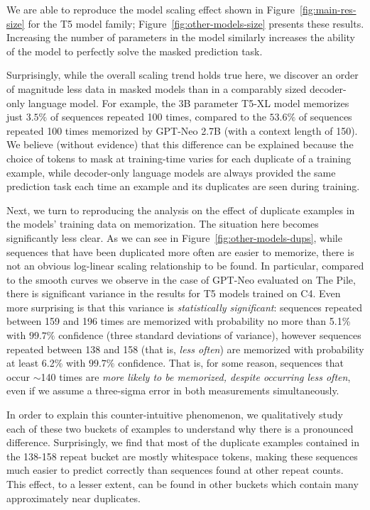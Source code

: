 %
We are able to reproduce the model scaling effect shown in Figure~\ref{fig:main-res-size} for the T5 model family;
Figure~\ref{fig:other-models-size} presents these results.
%
Increasing the number of parameters in the model similarly increases the ability of the model
to perfectly solve the masked prediction task.

Surprisingly, while the overall scaling trend holds true here, we discover an order of magnitude less data in masked models than in a comparably sized decoder-only language model.
%
For example, the $3$B parameter T5-XL model memorizes just $3.5\%$ of sequences repeated 100 times, compared to the $53.6\%$ of sequences repeated 100 times memorized by GPT-Neo 2.7B (with a context length of 150). 
We believe (without evidence) that this difference can be explained because the choice of tokens to mask at training-time varies for each duplicate of a training example, while decoder-only language models are always provided the same prediction task each time an example and its duplicates are seen during training.

Next, we turn to reproducing the analysis on the effect of duplicate examples in the models' training data on memorization.
%
The situation here becomes significantly less clear.
%
As we can see in Figure~\ref{fig:other-models-dups}, while sequences that have been duplicated more often are easier to memorize,
there is not an obvious log-linear scaling relationship to be found.
%
In particular, compared to the smooth curves we observe in the case of GPT-Neo evaluated on The Pile,
there is significant variance in the results for T5 models trained on C4.
%
Even more surprising is that this variance is \emph{statistically significant}:
sequences repeated between 159 and 196 times are memorized with probability no more than 5.1\% with $99.7\%$ confidence (three standard deviations of variance),
however sequences repeated between 138 and 158 (that is, \emph{less often}) are memorized with probability
at least 6.2\% with $99.7\%$ confidence.
%
That is, for some reason, sequences that occur $\sim$140 times are \emph{more likely to be memorized, despite occurring less often}, even if we assume a three-sigma error in both measurements simultaneously.

In order to explain this counter-intuitive phenomenon, we qualitatively study each of these two buckets
of examples to understand why there is a pronounced difference.
%
Surprisingly, we find that most of the duplicate examples contained in the 138-158 repeat bucket are mostly whitespace tokens, making these sequences much easier to predict correctly than sequences found at other repeat counts.
This effect, to a lesser extent, can be found in other buckets which contain many approximately near duplicates.

